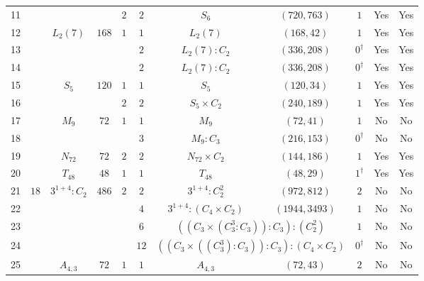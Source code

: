 \documentclass[12pt]{amsart}
\numberwithin{equation}{section}
\theoremstyle{plain}
\theoremstyle{definition}
\theoremstyle{remark}
\begin{document}
{\begin{longtable}{|c|c|c|c|c|c|c|c|c|c|c|}
11 &  &  &  & $2$ & $2$ & \multicolumn{1}{c|}{$S_6$} & $(720,763)$ & $1$ & Yes & Yes \\ \cline{1-1} \cline{3-11}
12 &  & \multirow[t]{3}{*}{$L_2(7)$} & \multirow[t]{3}{*}{$168$} & \multirow[t]{3}{*}{$1$} & $1$ & \multicolumn{1}{c|}{$L_2(7)$} & $(168,42)$ & $1$ & Yes & Yes \\ \cline{1-1} \cline{6-11}
13 &  &  &  &  & $2$ & \multicolumn{1}{c|}{$L_2(7):C_2$} & $(336,208)$ & $0^\dagger$ & Yes & Yes \\ \cline{1-1} \cline{6-11}
14 &  &  &  &  & $2$ & \multicolumn{1}{c|}{$L_2(7):C_2$} & $(336,208)$ & $0^\dagger$ & Yes & Yes \\ \cline{1-1} \cline{3-11}
15 &  & \multirow[t]{2}{*}{$S_5$} & \multirow[t]{2}{*}{$120$} & $1$ & $1$ & \multicolumn{1}{c|}{$S_5$} & $(120,34)$ & $1$ & Yes & Yes \\ \cline{1-1} \cline{5-11}
16 &  &  &  & $2$ & $2$ & \multicolumn{1}{c|}{$S_5\times C_2$} & $(240,189)$ & $1$ & Yes & Yes \\ \cline{1-1} \cline{3-11}
17 &  & \multirow[t]{2}{*}{$M_9$} & \multirow[t]{2}{*}{$72$} & \multirow[t]{2}{*}{$1$} & $1$ & \multicolumn{1}{c|}{$M_9$} & $(72,41)$ & $1$ & No & No \\ \cline{1-1} \cline{6-11}
18 &  &  &  &  & $3$ & \multicolumn{1}{c|}{$M_9:C_3$} & $(216,153)$ & $0^\dagger$ & No & No \\ \cline{1-1} \cline{3-11}
19 &  & $N_{72}$ & $72$ & $2$ & $2$ & \multicolumn{1}{c|}{$N_{72}\times C_2$} & $(144,186)$ & $1$ & Yes & Yes \\ \cline{1-1} \cline{3-11}
20 &  & $T_{48}$ & $48$ & $1$ & $1$ & \multicolumn{1}{c|}{$T_{48}$} & $(48,29)$ & $1^\dagger$ & Yes & Yes \\ \hline
21 & \multirow[t]{24}{*}{$18$} & \multirow[t]{4}{*}{$3^{1+4}:C_2$} & \multirow[t]{4}{*}{$486$} & \multirow[t]{4}{*}{$2$} & $2$ & \multicolumn{1}{c|}{$3^{1+4}:C_2^2$} & $(972,812)$ & $2$ & No & No \\ \cline{1-1} \cline{6-11}
22 &  &  &  &  & $4$ & \multicolumn{1}{c|}{$3^{1+4}:(C_4\times C_2)$} & $(1944,3493)$ & $1$ & No & No \\ \cline{1-1} \cline{6-11}
23 &  &  &  &  & $6$ & \multicolumn{2}{c|}{$((C_3\times(C_3^3:C_3)):C_3):(C_2^2)$} & $1$ & No & No \\ \cline{1-1} \cline{6-11}
24 &  &  &  &  & $12$ & \multicolumn{2}{c|}{$((C_3 \times ((C_3^3) : C_3)) : C_3) : (C_4 \times C_2)$} & $0^\dagger$ & No & No \\ \cline{1-1} \cline{3-11}
25 &  & \multirow[t]{4}{*}{$A_{4,3}$} & \multirow[t]{4}{*}{$72$} & \multirow[t]{2}{*}{$1$} & $1$ & \multicolumn{1}{c|}{$A_{4,3}$} & $(72,43)$ & $2$ & No & No \\ \cline{1-1} \cline{6-11}

\end{longtable}}
\end{document}
